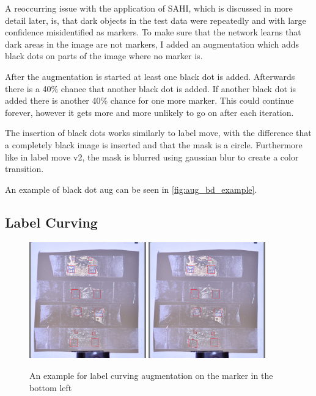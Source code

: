 \documentclass[10pt]{book}
\begin{document}
A reoccurring issue with the application of \ac{SAHI}, which is discussed in more detail later, is, that dark objects in the test data were repeatedly and with large confidence misidentified as markers. To make sure that the network learns that dark areas in the image are not markers, I added an augmentation which adds black dots on parts of the image where no marker is. 

After the augmentation is started at least one black dot is added. Afterwards there is a 40\% chance that another black dot is added. If another black dot is added there is another 40\% chance for one more marker. This could continue forever, however it gets more and more unlikely to go on after each iteration. 

The insertion of black dots works similarly to label move, with the difference that a completely black image is inserted and that the mask is a circle. Furthermore like in label move v2, the mask is blurred using gaussian blur to create a color transition.

An example of black dot aug can be seen in \autoref{fig:aug_bd_example}.

\subsection{Label Curving}

\begin{figure}
  \centering
     {\includegraphics[width=0.45\textwidth]{image/aug_lc_before}}
     {\includegraphics[width=0.45\textwidth]{image/aug_lc_after}}
  \caption{An example for label curving augmentation on the marker in the bottom left}
  \label{fig:aug_lc_example}
\end{figure}
\end{document}
